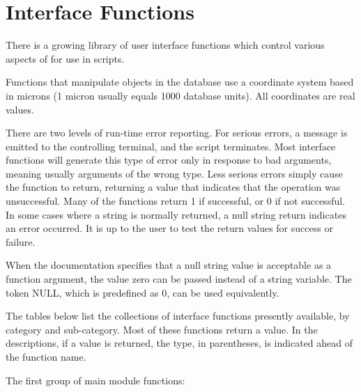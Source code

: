 
\chapter{Interface Functions}

There is a growing library of user interface functions which control
various aspects of {\Xic} for use in scripts.

Functions that manipulate objects in the database use a coordinate
system based in microns (1 micron usually equals 1000 database units). 
All coordinates are real values.

There are two levels of run-time error reporting.  For serious errors,
a message is emitted to the controlling terminal, and the script
terminates.  Most interface functions will generate this type of error
only in response to bad arguments, meaning usually arguments of the
wrong type.  Less serious errors simply cause the function to return,
returning a value that indicates that the operation was unsuccessful. 
Many of the functions return 1 if successful, or 0 if not successful. 
In some cases where a string is normally returned, a null string
return indicates an error occurred.  It is up to the user to test the
return values for success or failure.

When the documentation specifies that a null string value is
acceptable as a function argument, the value zero can be passed
instead of a string variable.  The token {\vt NULL}, which is predefined
as 0, can be used equivalently.

The tables below list the collections of interface functions presently
available, by category and sub-category.  Most of these functions
return a value.  In the descriptions, if a value is returned, the
type, in parentheses, is indicated ahead of the function name.

\newcommand{\vr}{\tt\raggedright}

The first group of main module functions:

